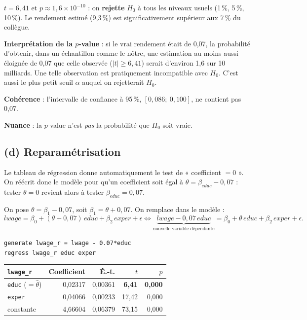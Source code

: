 \documentclass[11pt,a4paper]{article}
\begin{document}
\begin{reponse}
$t=6{,}41$ et $p\approx1{,}6\times10^{-10}$ : on \textbf{rejette} $H_0$ à tous les niveaux usuels (1\,\%, 5\,\%, 10\,\%). Le rendement estimé (9,3\,\%) est significativement supérieur aux 7\,\% du collègue.

\textbf{Interprétation de la $p$-value} : si le vrai rendement était de 0,07, la probabilité d'obtenir, dans un échantillon comme le nôtre, une estimation au moins aussi éloignée de 0,07 que celle observée ($|t|\ge6{,}41$) serait d'environ 1,6 sur 10 milliards. Une telle observation est pratiquement incompatible avec $H_0$. C'est aussi le plus petit seuil $\alpha$ auquel on rejetterait $H_0$.

\textbf{Cohérence} : l'intervalle de confiance à 95\,\%, $[0{,}086;\ 0{,}100]$, ne contient pas 0,07.

\textbf{Nuance} : la $p$-value n'est \emph{pas} la probabilité que $H_0$ soit vraie.
\end{reponse}

\subsection{(d) Reparamétrisation}

\begin{idee}
Le tableau de régression donne automatiquement le test de « coefficient $=0$ ». On réécrit donc le modèle pour qu'un coefficient soit égal à $\theta=\beta_{educ}-0{,}07$ : tester $\theta=0$ revient alors à tester $\beta_{educ}=0{,}07$.
\end{idee}

On pose $\theta=\beta_1-0{,}07$, soit $\beta_1=\theta+0{,}07$. On remplace dans le modèle :
\[
lwage=\beta_0+(\theta+0{,}07)\,educ+\beta_2\,exper+\epsilon
\iff
\underbrace{lwage-0{,}07\,educ}_{\text{nouvelle variable dépendante}}=\beta_0+\theta\,educ+\beta_2\,exper+\epsilon .
\]
\begin{lstlisting}
generate lwage_r = lwage - 0.07*educ
regress lwage_r educ exper
\end{lstlisting}
\begin{center}
\begin{tabular}{@{}lrrrr@{}}
\toprule
\texttt{lwage\_r} & Coefficient & É.-t. & $t$ & $p$ \\
\midrule
\texttt{educ} ($=\hat\theta$) & 0,02317 & 0,00361 & \textbf{6,41} & \textbf{0,000} \\
\texttt{exper} & 0,04066 & 0,00233 & 17,42 & 0,000 \\
constante & 4,66604 & 0,06379 & 73,15 & 0,000 \\
\bottomrule
\end{tabular}
\end{center}
\end{document}
